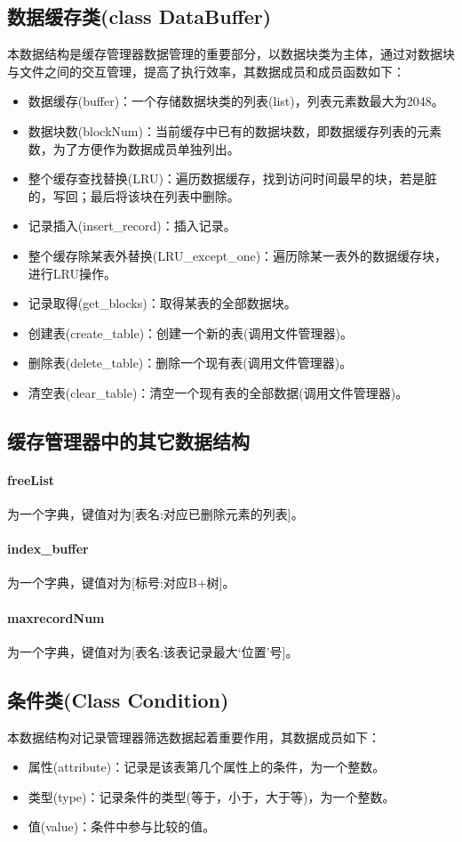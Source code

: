 \documentclass[UTF8]{ctexrep} %
\begin{document}
\subsection{数据缓存类(class DataBuffer)}
本数据结构是缓存管理器数据管理的重要部分，以数据块类为主体，通过对数据块与文件之间的交互管理，提高了执行效率，其数据成员和成员函数如下：
\begin{itemize}
	\item 数据缓存(buffer)：一个存储数据块类的列表(list)，列表元素数最大为2048。
	\item 数据块数(blockNum)：当前缓存中已有的数据块数，即数据缓存列表的元素数，为了方便作为数据成员单独列出。
	\item 整个缓存查找替换(LRU)：遍历数据缓存，找到访问时间最早的块，若是脏的，写回；最后将该块在列表中删除。
	\item 记录插入(insert\_record)：插入记录。
	\item 整个缓存除某表外替换(LRU\_except\_one)：遍历除某一表外的数据缓存块，进行LRU操作。
	\item 记录取得(get\_blocks)：取得某表的全部数据块。
	\item 创建表(create\_table)：创建一个新的表(调用文件管理器)。
	\item 删除表(delete\_table)：删除一个现有表(调用文件管理器)。
	\item 清空表(clear\_table)：清空一个现有表的全部数据(调用文件管理器)。
\end{itemize}

\subsection{缓存管理器中的其它数据结构}
\paragraph{freeList} 为一个字典，键值对为[表名:对应已删除元素的列表]。
\paragraph{index\_buffer} 为一个字典，键值对为[标号:对应B+树]。
\paragraph{maxrecordNum} 为一个字典，键值对为[表名:该表记录最大‘位置’号]。

\subsection{条件类(Class Condition)}
本数据结构对记录管理器筛选数据起着重要作用，其数据成员如下：
\begin{itemize}
	\item 属性(attribute)：记录是该表第几个属性上的条件，为一个整数。
	\item 类型(type)：记录条件的类型(等于，小于，大于等)，为一个整数。
	\item 值(value)：条件中参与比较的值。
\end{itemize}
\end{document}
